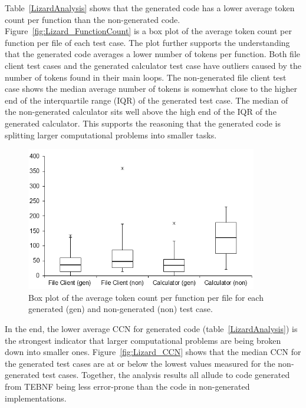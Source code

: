 \indent
Table~\ref{LizardAnalysis} shows that the generated code has a lower average token count per function than the non-generated code.  Figure~\ref{fig:Lizard_FunctionCount} is a box plot of the average token count per function per file of each test case.  The plot further supports the understanding that the generated code averages a lower number of tokens per function.  Both file client test cases and the generated calculator test case have outliers caused by the number of tokens found in their main loops.  The non-generated file client test case shows the median average number of tokens is somewhat close to the higher end of the interquartile range (IQR) of the generated test case.  The median of the non-generated calculator sits well above the high end of the IQR of the generated calculator.  This supports the reasoning that the generated code is splitting larger computational problems into smaller tasks.

\begin{figure}[h!]
\centering
\includegraphics[width=0.9\textwidth]{figures/Lizard_TokenCount.png}
\caption[Box plot of the average token count per function per file for each generated and non-generated test case.]{Box plot of the average token count per function per file for each generated (gen) and non-generated (non) test case.}
\label{fig:Lizard_TokenCount}
\end{figure}

\indent
In the end, the lower average CCN for generated code (table~\ref{LizardAnalysis}) is the strongest indicator that larger computational problems are being broken down into smaller ones.  Figure~\ref{fig:Lizard_CCN} shows that the median CCN for the generated test cases are at or below the lowest values measured for the non-generated test cases.
Together, the analysis results all allude to code generated from TEBNF being less error-prone than the code in non-generated implementations.

